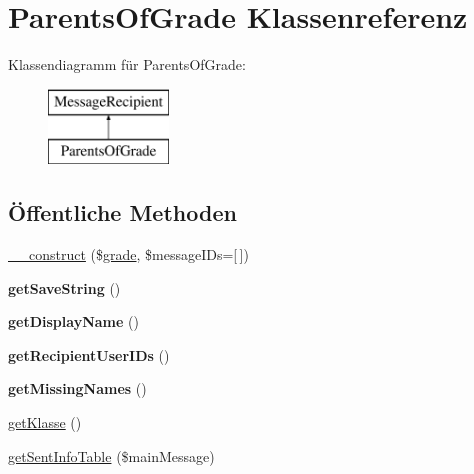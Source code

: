 \hypertarget{class_parents_of_grade}{}\section{Parents\+Of\+Grade Klassenreferenz}
\label{class_parents_of_grade}
Klassendiagramm für Parents\+Of\+Grade\+:\begin{figure}[H]
\begin{center}
\leavevmode
\includegraphics[height=2.000000cm]{class_parents_of_grade}
\end{center}
\end{figure}
\subsection*{Öffentliche Methoden}
\begin{DoxyCompactItemize}
\item 
\mbox{\hyperlink{class_parents_of_grade_a51d5acefa69a4ad5d6af4d858c6360ff}{\+\_\+\+\_\+construct}} (\$\mbox{\hyperlink{classgrade}{grade}}, \$message\+I\+Ds=\mbox{[}$\,$\mbox{]})
\item 
\mbox{\label{class_parents_of_grade_ad3a482ea2ab615280e98b3d4412f027f}} 
{\bfseries get\+Save\+String} ()
\item 
\mbox{\label{class_parents_of_grade_a416806b07f3cc34639acb05879d6a6ca}} 
{\bfseries get\+Display\+Name} ()
\item 
\mbox{\label{class_parents_of_grade_ae48e0817e32bac4f1f2d266d4b87626a}} 
{\bfseries get\+Recipient\+User\+I\+Ds} ()
\item 
\mbox{\label{class_parents_of_grade_a5ec57ec482ff8b2b661156f4bc2dd805}} 
{\bfseries get\+Missing\+Names} ()
\item 
\mbox{\hyperlink{class_parents_of_grade_a5a77cad82ae67a5520fb2522c75e621b}{get\+Klasse}} ()
\item 
\mbox{\hyperlink{class_parents_of_grade_ac8dd07cd080e74294ef2c6b50460bab0}{get\+Sent\+Info\+Table}} (\$main\+Message)
\end{DoxyCompactItemize}
